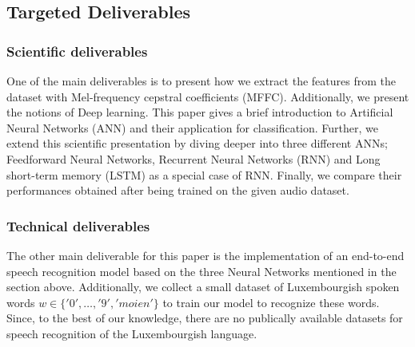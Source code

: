 
\subsection{Targeted Deliverables}

\subsubsection{Scientific deliverables}



One of the main deliverables is to present how we extract the features from the
dataset with Mel-frequency cepstral coefficients (MFFC). Additionally, we
present the notions of Deep learning. This paper gives a brief introduction to
Artificial Neural Networks (ANN) and their application for classification.
Further, we extend this scientific presentation by diving deeper into three
different ANNs; Feedforward Neural Networks, Recurrent Neural Networks (RNN) and
Long short-term memory (LSTM) as a special case of RNN. Finally, we compare
their performances obtained after being trained on the given audio dataset.

\subsubsection{Technical deliverables} 

The other main deliverable for this paper is the implementation of an end-to-end
speech recognition model based on the three Neural Networks mentioned in the
section above.  Additionally, we collect a small dataset of Luxembourgish spoken
words $w \in \{'0',\dots,'9','moien'\}$ to train our model to recognize these
words. Since, to the best of our knowledge, there are no publically available
datasets for speech recognition of the Luxembourgish language.

